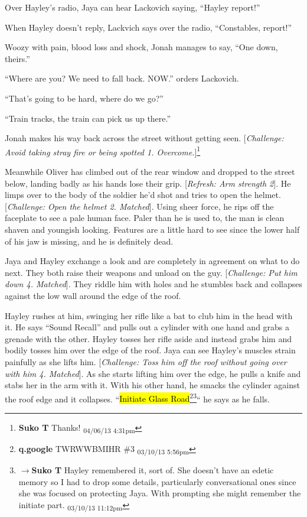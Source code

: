 Over Hayley's radio, Jaya can hear Lackovich saying, ``Hayley report!''



When Hayley doesn't reply, Lackvich says over the radio, ``Constables, report!''



Woozy with pain, blood loss and shock, Jonah manages to say, ``One down, theirs.''

``Where are you?  We need to fall back.  NOW.'' orders Lackovich.

``That's going to be hard, where do we go?''

``Train tracks, the train can pick us up there.''

Jonah makes his way back across the street without getting seen.  {[}\textit{Challenge: Avoid taking stray fire or being spotted 1.  Overcome.}{]}\footnote{\textbf{Suko T }Thanks! \textsubscript{04/06/13 4:31pm}}



Meanwhile Oliver has climbed out of the rear window and dropped to the street below, landing badly as his hands lose their grip.  {[}\textit{Refresh: Arm strength 2}{]}.  He limps over to the body of the soldier he'd shot and tries to open the helmet.  {[}\textit{Challenge: Open the helmet 2.  Matched}{]}.  Using sheer force, he rips off the faceplate to see a pale human face.  Paler than he is used to, the man is clean shaven and youngish looking.  Features are a little hard to see since the lower half of his jaw is missing, and he is definitely dead.



Jaya and Hayley exchange a look and are completely in agreement on what to do next.  They both raise their weapons and unload on the guy.  {[}\textit{Challenge: Put him down 4.  Matched}{]}.  They riddle him with holes and he stumbles back and collapses against the low wall around the edge of the roof.



Hayley rushes at him, swinging her rifle like a bat to club him in the head with it.  He says ``Sound Recall'' and pulls out a cylinder with one hand and grabs a grenade with the other.  Hayley tosses her rifle aside and instead grabs him and bodily tosses him over the edge of the roof.  Jaya can see Hayley's muscles strain painfully as she lifts him.  {[}\textit{Challenge: Toss him off the roof without going over with him 4. Matched}{]}.  As she starts lifting him over the edge, he pulls a knife and stabs her in the arm with it.  With his other hand, he smacks the cylinder against the roof edge and it collapses.  ``\hl{Initiate Glass Road}\footnote{\textbf{q.google }TWRWWBMIHR \#3 \textsubscript{03/10/13 5:56pm}}\footnote{$\rightarrow$\textbf{Suko T }Hayley remembered it, sort of.  She doesn't have an edetic memory so I had to drop some details, particularly conversational ones since she was focused on protecting Jaya.  With prompting she might remember the initiate part. \textsubscript{03/10/13 11:12pm}}`` he says as he falls.



